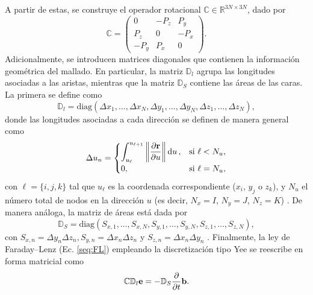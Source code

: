 A partir de estas, se construye el operador rotacional $\mathbb{C}\in\mathbb{R}^{3N\times 3N}$, dado por \cite{hadabSolutionMaxwellsEquation2023}
%
\begin{equation}
	\mathbb{C}=\begin{pmatrix}
		0 & -P_z & P_y\\
		P_z & 0 & -P_x\\
		-P_y & P_x & 0
	\end{pmatrix}.
\end{equation}
Adicionalmente, se introducen matrices diagonales que contienen la información geométrica del mallado. En particular, la matriz $\mathbb{D}_l$ agrupa las longitudes asociadas a las aristas, mientras que la matriz $\mathbb{D}_S$ contiene las áreas de las caras. La primera se define como \cite{hadabSolutionMaxwellsEquation2023}
%
\begin{equation}
	\mathbb{D}_l=\text{diag}(\Delta x_{1},\dotso,\Delta x_{N},\Delta y_{1},\dotso,\Delta y_{N},\Delta z_{1},\dotso,\Delta z_{N}),
\end{equation}
%
donde las longitudes asociadas a cada dirección se definen de manera general como \cite{hadabSolutionMaxwellsEquation2023}
%
\begin{equation}
	\Delta u_n =
	\begin{cases}
		\displaystyle \int_{u_\ell}^{u_{\ell+1}} \left\lVert \frac{\partial \vb{r}}{\partial u} \right\rVert \dd{u}, & \text{si } \ell < N_u,\\
		0, & \text{si } \ell = N_u,
	\end{cases}
\end{equation}
%
con $\ell=\{i,j,k\}$ tal que $u_\ell$ es la coordenada correspondiente ($x_i$, $y_j$ o $z_k$), y $N_u$ el número total de nodos en la dirección $u$ (es decir, $N_x=I$, $N_y=J$, $N_z=K$) \cite{hadabSolutionMaxwellsEquation2023}. De manera análoga, la matriz de áreas está dada por \cite{hadabSolutionMaxwellsEquation2023}
%
\begin{equation}
	\mathbb{D}_S=\text{diag}(S_{x,1},\dotso,S_{x,N}, S_{y,1},\dotso,S_{y,N},S_{z,1},\dotso,S_{z,N}),
\end{equation}
%
con $S_{x,n}=\Delta y_n \Delta z_n, S_{y,n}=\Delta x_n \Delta z_n$ y $S_{z,n}=\Delta x_n \Delta y_n$ \cite{hadabSolutionMaxwellsEquation2023}. Finalmente, la ley de Faraday–Lenz (Ec. \eqref{seq:FL}) empleando la discretización tipo Yee se reescribe en forma matricial como \cite{hadabSolutionMaxwellsEquation2023}
%
\begin{equation}
	\mathbb{C}\mathbb{D}_l\vb{e}=-\mathbb{D}_S\frac{\partial}{\partial t}\vb{b}.
\end{equation}
%


